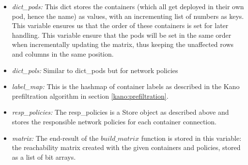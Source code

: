 \begin{itemize}
    \renewcommand{\labelitemi}{\scriptsize$\blacksquare$}
    \item \textit{dict\_pods:} This dict stores the containers (which all get deployed in their own pod, hence the name) as values, with an incrementing list of numbers as keys. This variable ensures us that the order of these containers is set for later handling. This variable ensure that the pods will be set in the same order when incrementally updating the matrix, thus keeping the unaffected rows and columns in the same position.
     \item \textit{dict\_pols:} Similar to dict\_pods but for network policies
     \item \textit{label\_map:} This is the hashmap of container labels as described in the Kano prefiltration algorithm in section \ref{kano:prefiltration}. 
     \item \textit{resp\_policies:} The resp\_policies is a Store object as described above and stores the responsible network policies for each container connection.
     \item \textit{matrix:} The end-result of the $build\_matrix$ function is stored in this variable: the reachability matrix created with the given containers and policies, stored as a list of bit arrays.
\end{itemize}

